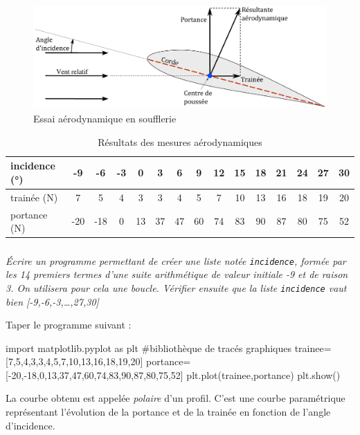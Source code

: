 \documentclass[10pt]{article}
\begin{document}
\begin{figure}[h]
\centering
\includegraphics[width=.7\linewidth]{images/profil-aile.pdf}
\caption{Essai aérodynamique en soufflerie}\label{fig:profil-aile}
\end{figure}

\begin{table}[h]
\centering
\begin{tabular}{|l|c|c|c|c|c|c|c|c|c|c|c|c|c|c|}
\hline
incidence (°) & -9 & -6 & -3 & 0 & 3 & 6 & 9 & 12 & 15 & 18 & 21 & 24 & 27 & 30 \\
\hline
trainée (N) & 7 &5&4&3&3&4&5&7&10&13&16&18&19&20 \\
\hline
portance (N) &-20&-18&0&13&37&47&60&74&83&90&87&80&75&52\\
\hline
\end{tabular}
\caption{Résultats des mesures aérodynamiques}\label{tab:mesures-aero}
\end{table}




\subparagraph{}
\textit{\'Ecrire un programme permettant de créer une liste notée \texttt{incidence}, formée par les 14 premiers termes d'une suite arithmétique de valeur initiale -9 et de raison 3. On utilisera pour cela une boucle. Vérifier ensuite que la liste \texttt{incidence} vaut bien [-9,-6,-3,\ldots{},27,30]}



Taper le programme suivant :
\begin{py}
\begin{python}
import matplotlib.pyplot as plt			#bibliothèque de tracés graphiques
trainee=[7,5,4,3,3,4,5,7,10,13,16,18,19,20]
portance=[-20,-18,0,13,37,47,60,74,83,90,87,80,75,52]
plt.plot(trainee,portance)
plt.show()
\end{python}
\end{py}

\begin{rem}
La courbe obtenu est appelée \emph{polaire} d'un profil. C'est une courbe paramétrique représentant l'évolution de la portance et de la trainée en fonction de l'angle d'incidence.
\end{rem}
\end{document}
